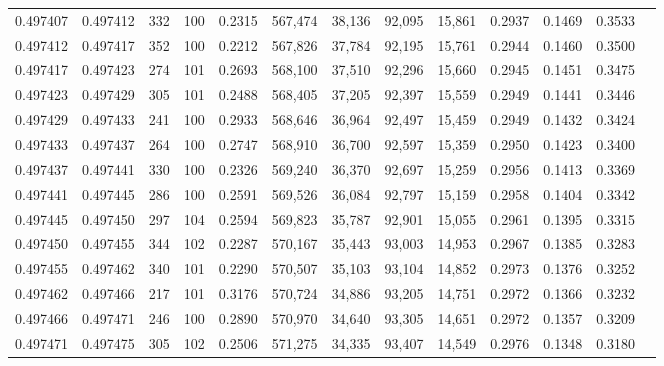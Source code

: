 \begin{tabular}{rrrrrrrrrrrrr}
0.497407 & 0.497412 &   332 & 100 &                                     0.2315 & 567,474 &  38,136 &  92,095 &  15,861 & 0.2937 & 0.1469 & 0.3533 \\
0.497412 & 0.497417 &   352 & 100 &                                     0.2212 & 567,826 &  37,784 &  92,195 &  15,761 & 0.2944 & 0.1460 & 0.3500 \\
0.497417 & 0.497423 &   274 & 101 &                                     0.2693 & 568,100 &  37,510 &  92,296 &  15,660 & 0.2945 & 0.1451 & 0.3475 \\
0.497423 & 0.497429 &   305 & 101 &                                     0.2488 & 568,405 &  37,205 &  92,397 &  15,559 & 0.2949 & 0.1441 & 0.3446 \\
0.497429 & 0.497433 &   241 & 100 &                                     0.2933 & 568,646 &  36,964 &  92,497 &  15,459 & 0.2949 & 0.1432 & 0.3424 \\
0.497433 & 0.497437 &   264 & 100 &                                     0.2747 & 568,910 &  36,700 &  92,597 &  15,359 & 0.2950 & 0.1423 & 0.3400 \\
0.497437 & 0.497441 &   330 & 100 &                                     0.2326 & 569,240 &  36,370 &  92,697 &  15,259 & 0.2956 & 0.1413 & 0.3369 \\
0.497441 & 0.497445 &   286 & 100 &                                     0.2591 & 569,526 &  36,084 &  92,797 &  15,159 & 0.2958 & 0.1404 & 0.3342 \\
0.497445 & 0.497450 &   297 & 104 &                                     0.2594 & 569,823 &  35,787 &  92,901 &  15,055 & 0.2961 & 0.1395 & 0.3315 \\
0.497450 & 0.497455 &   344 & 102 &                                     0.2287 & 570,167 &  35,443 &  93,003 &  14,953 & 0.2967 & 0.1385 & 0.3283 \\
0.497455 & 0.497462 &   340 & 101 &                                     0.2290 & 570,507 &  35,103 &  93,104 &  14,852 & 0.2973 & 0.1376 & 0.3252 \\
0.497462 & 0.497466 &   217 & 101 &                                     0.3176 & 570,724 &  34,886 &  93,205 &  14,751 & 0.2972 & 0.1366 & 0.3232 \\
0.497466 & 0.497471 &   246 & 100 &                                     0.2890 & 570,970 &  34,640 &  93,305 &  14,651 & 0.2972 & 0.1357 & 0.3209 \\
0.497471 & 0.497475 &   305 & 102 &                                     0.2506 & 571,275 &  34,335 &  93,407 &  14,549 & 0.2976 & 0.1348 & 0.3180 \\

\end{tabular}
